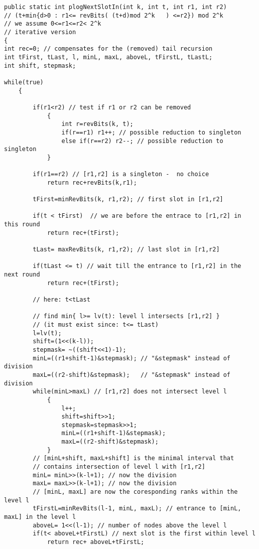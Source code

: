 \begin{verbatim}
public static int plogNextSlotIn(int k, int t, int r1, int r2)
// (t+min{d>0 : r1<= revBits( (t+d)mod 2^k   ) <=r2}) mod 2^k 
// we assume 0<=r1<=r2< 2^k 
// iterative version
{
int rec=0; // compensates for the (removed) tail recursion
int tFirst, tLast, l, minL, maxL, aboveL, tFirstL, tLastL;
int shift, stepmask;

while(true)
    {

        if(r1<r2) // test if r1 or r2 can be removed
            {
                int r=revBits(k, t);
                if(r==r1) r1++; // possible reduction to singleton
                else if(r==r2) r2--; // possible reduction to singleton
            }

        if(r1==r2) // [r1,r2] is a singleton -  no choice
            return rec+revBits(k,r1); 

        tFirst=minRevBits(k, r1,r2); // first slot in [r1,r2]

        if(t < tFirst)  // we are before the entrace to [r1,r2] in this round
            return rec+(tFirst);

        tLast= maxRevBits(k, r1,r2); // last slot in [r1,r2]

        if(tLast <= t) // wait till the entrance to [r1,r2] in the next round 
            return rec+(tFirst); 

        // here: t<tLast

        // find min{ l>= lv(t): level l intersects [r1,r2] } 
        // (it must exist since: t<= tLast) 
        l=lv(t);
        shift=(1<<(k-l));
        stepmask= ~((shift<<1)-1);
        minL=((r1+shift-1)&stepmask); // "&stepmask" instead of division
        maxL=((r2-shift)&stepmask);   // "&stepmask" instead of division
        while(minL>maxL) // [r1,r2] does not intersect level l
            {
                l++;
                shift=shift>>1;
                stepmask=stepmask>>1;
                minL=((r1+shift-1)&stepmask);
                maxL=((r2-shift)&stepmask);
            }
        // [minL+shift, maxL+shift] is the minimal interval that 
        // contains intersection of level l with [r1,r2] 
        minL= minL>>(k-l+1); // now the division
        maxL= maxL>>(k-l+1); // now the division
        // [minL, maxL] are now the coresponding ranks within the level l
        tFirstL=minRevBits(l-1, minL, maxL); // entrance to [minL, maxL] in the level l 
        aboveL= 1<<(l-1); // number of nodes above the level l 
        if(t< aboveL+tFirstL) // next slot is the first within level l		       
            return rec+ aboveL+tFirstL; 



\end{verbatim}
